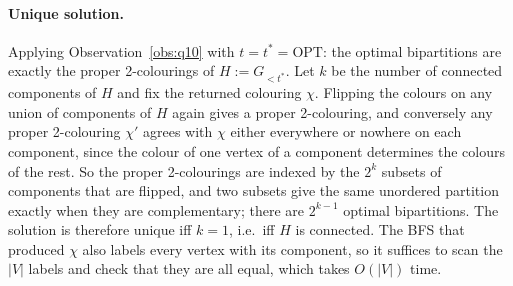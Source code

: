 \documentclass[11pt,letterpaper]{article}
\theoremstyle{definition}
\newcommand{\OPT}{\mathrm{OPT}}
\begin{document}
\paragraph{Unique solution.}
Applying Observation~\ref{obs:q10} with $t=t^*=\OPT$: the optimal bipartitions are exactly the proper 2-colourings of $H:=G_{<t^*}$.
Let $k$ be the number of connected components of $H$ and fix the returned colouring $\chi$.
Flipping the colours on any union of components of $H$ again gives a proper 2-colouring, and conversely any proper 2-colouring $\chi'$ agrees with $\chi$ either everywhere or nowhere on each component, since the colour of one vertex of a component determines the colours of the rest.
So the proper 2-colourings are indexed by the $2^k$ subsets of components that are flipped, and two subsets give the same unordered partition exactly when they are complementary; there are $2^{k-1}$ optimal bipartitions.
The solution is therefore unique iff $k=1$, i.e.\ iff $H$ is connected.
The BFS that produced $\chi$ also labels every vertex with its component, so it suffices to scan the $|V|$ labels and check that they are all equal, which takes $O(|V|)$ time.
\end{document}
